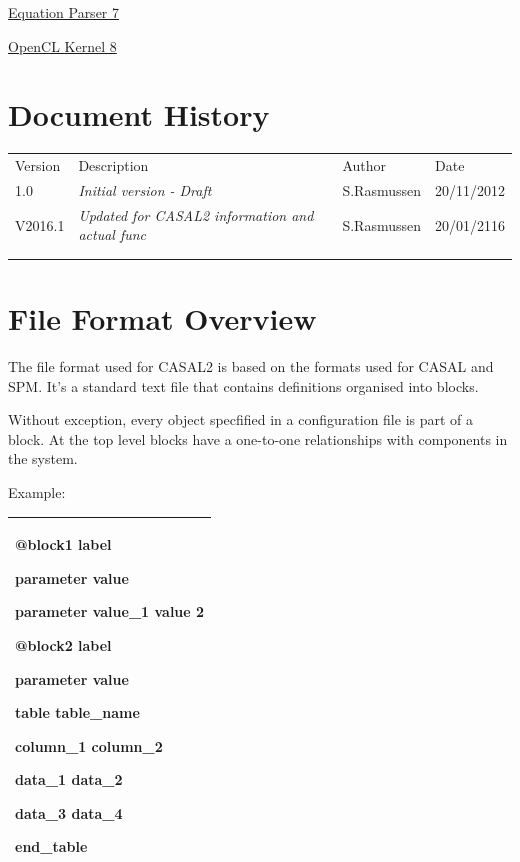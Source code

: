 \documentclass[a4paper,11pt,twoside,pdftex,draft]{article}
\begin{document}
\protect\hyperlink{equation-parser-1}{Equation Parser 7}

\protect\hyperlink{opencl-kernel}{OpenCL Kernel 8}

\hypertarget{document-history}{%
\section{Document History}\label{document-history}}

\begin{longtable}[]{@{}llll@{}}
\toprule
\endhead
Version & Description & Author & Date\tabularnewline
1.0 & \emph{Initial version - Draft} & S.Rasmussen &
20/11/2012\tabularnewline
V2016.1 & \emph{Updated for CASAL2 information and actual func} &
S.Rasmussen & 20/01/2116\tabularnewline
& & &\tabularnewline
& & &\tabularnewline
\bottomrule
\end{longtable}

\hypertarget{file-format-overview}{%
\section{\texorpdfstring{File Format Overview
}{File Format Overview }}\label{file-format-overview}}

The file format used for CASAL2 is based on the formats used for CASAL
and SPM. It's a standard text file that contains definitions organised
into blocks.

Without exception, every object specfified in a configuration file is
part of a block. At the top level blocks have a one-to-one relationships
with components in the system.

Example:

\begin{longtable}[]{@{}l@{}}
\toprule
\endhead
\begin{minipage}[t]{0.97\columnwidth}\raggedright
@block1 label

parameter value

parameter value\_1 value 2

@block2 label

parameter value

table table\_name

column\_1 column\_2

data\_1 data\_2

data\_3 data\_4

end\_table\strut
\end{minipage}\tabularnewline
\bottomrule
\end{longtable}
\end{document}
